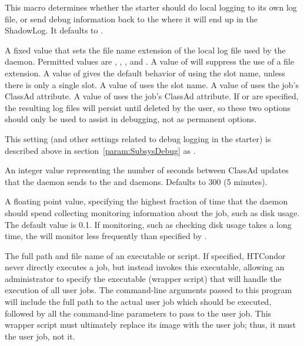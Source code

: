 \begin{description}
\label{param:StarterLocalLogging}
\item[\Macro{STARTER\_LOCAL\_LOGGING}]
  This macro determines whether the
  starter should do local logging to its own log file, or send debug
  information back to the  where it will end up in the
  ShadowLog.  It defaults to .

\label{param:StarterLogNameAppend}
\item[\Macro{STARTER\_LOG\_NAME\_APPEND}]
  A fixed value that sets the file name extension of the local log file used
  by the  daemon. 
  Permitted values are , , , 
   and .
  A value of  will suppress the use of a file extension.
  A value of  gives the default behavior of using the slot name,
  unless there is only a single slot. 
  A value of  uses the slot name.
  A value of  uses the job's  ClassAd attribute.
  A value of  uses the job's  ClassAd attribute.
  If  or  are specified,
  the resulting log files will persist until deleted by the user,
  so these two options should only be used to assist in debugging, 
  not as permanent options.

\label{param:StarterDebug}
\item[\Macro{STARTER\_DEBUG}]
  This setting (and other settings related to debug logging in the starter) is
  described above in section~\ref{param:SubsysDebug} as
  .

\label{param:StarterUpdateInterval}
\item[\Macro{STARTER\_UPDATE\_INTERVAL}]
  An integer value representing the number of seconds between 
  ClassAd updates that the  daemon sends to the 
   and  daemons. 
  Defaults to 300 (5 minutes).

\label{param:StarterUpdateIntervalTimeslice}
\item[\Macro{STARTER\_UPDATE\_INTERVAL\_TIMESLICE}]
  A floating point value, specifying the highest fraction of time that the 
   daemon should spend collecting
  monitoring information about the job, such as disk usage.
  The default  value is 0.1.  
  If monitoring, such as checking disk usage takes a long time,
  the  will monitor less frequently than specified by
  .

\label{param:UserJobWrapper} 
\item[\Macro{USER\_JOB\_WRAPPER}]
  The full path and file name of an executable or script.
  If specified, HTCondor never directly executes a job, but instead
  invokes this executable,
  allowing an administrator to specify the executable (wrapper script) 
  that will handle the execution of all user jobs.  
  The command-line arguments passed to this program will include the
  full path to the actual user job which should be executed, followed by all
  the command-line parameters to pass to the user job.
  This wrapper script must ultimately replace its image with the user job;
  thus, it must  the user job, not  it.


\end{description}
